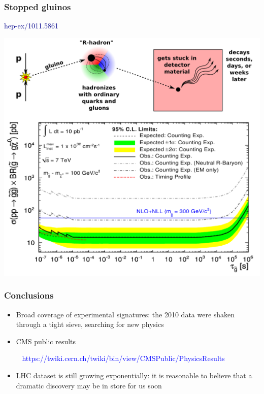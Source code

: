 \documentclass[compress]{beamer}
\begin{document}
\begin{frame}
\frametitle{Stopped gluinos}

\vspace{2.1 cm}
\hfill \textcolor{darkblue}{\scriptsize hep-ex/1011.5861}

\vspace{-2.6 cm}
\includegraphics[width=0.85\linewidth]{figures/stoppedgluino.png}
\end{frame}


\begin{frame}
\frametitle{Conclusions}
\begin{itemize}\setlength{\itemsep}{0.5 cm}
\item Broad coverage of experimental signatures: the 2010 data were shaken through a tight sieve, searching for new physics

\item CMS public results

\vspace{0.1 cm}
\mbox{ } \hfill \textcolor{blue}{https://twiki.cern.ch/twiki/bin/view/CMSPublic/PhysicsResults} \hfill \mbox{ }

\item LHC dataset is still growing exponentially: it is reasonable to believe that a dramatic discovery may be in store for us soon
\end{itemize}
\label{numpages}
\end{frame}
\end{document}
